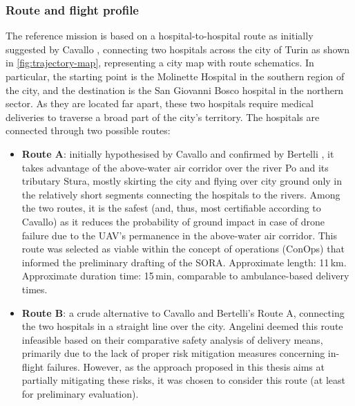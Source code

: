 \subsubsection{Route and flight profile}
The reference mission is based on a hospital-to-hospital route as initially suggested by Cavallo \cite{Cavallo2020}, connecting two hospitals across the city of Turin as shown in \cref{fig:trajectory-map}, representing a city map with route schematics. In particular, the starting point is the Molinette Hospital in the southern region of the city, and the destination is the San Giovanni Bosco hospital in the northern sector. As they are located far apart, these two hospitals require medical deliveries to traverse a broad part of the city's territory. The hospitals are connected through two possible routes:
\begin{itemize}
    \item \textbf{Route A}: initially hypothesised by Cavallo and confirmed by Bertelli \cite{Bertelli2021}, it takes advantage of the above-water air corridor over the river Po and its tributary Stura, mostly skirting the city and flying over city ground only in the relatively short segments connecting the hospitals to the rivers. Among the two routes, it is the safest (and, thus, most certifiable according to Cavallo) as it reduces the probability of ground impact in case of drone failure due to the UAV's permanence in the above-water air corridor. This route was selected as viable within the concept of operations (ConOps) that informed the preliminary drafting of the SORA. Approximate length: 11\,km. Approximate duration time: 15\,min, comparable to ambulance-based delivery times.
    \item \textbf{Route B}: a crude alternative to Cavallo and Bertelli's Route A, connecting the two hospitals in a straight line over the city. Angelini \cite{Angelini2023} deemed this route infeasible based on their comparative safety analysis of delivery means, primarily due to the lack of proper risk mitigation measures concerning in-flight failures. However, as the approach proposed in this thesis aims at partially mitigating these risks, it was chosen to consider this route (at least for preliminary evaluation).

\end{itemize}
